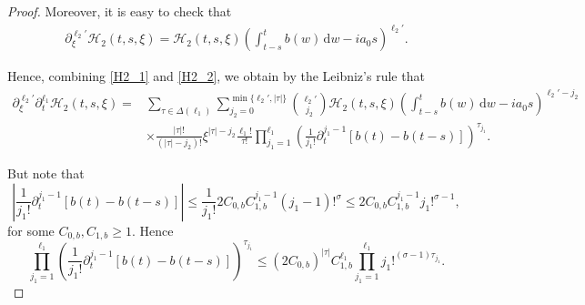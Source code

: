 \documentclass[11pt,reqno]{amsart}
\numberwithin{equation}{section}
\theoremstyle{definition}
\theoremstyle{definition}
\begin{document}
\begin{proof}
    Moreover, it is easy to check that 
    \begin{align}\label{H2_2}
        \partial_\xi^{\ell_2'}\mathcal{H}_2(t,s,\xi) = \mathcal{H}_2(t,s,\xi)\left(\int_{t-s}^tb(w)\,\mathrm{d}w-ia_0s\right)^{\ell_2'}.
    \end{align}
    
    Hence, combining \eqref{H2_1} and \eqref{H2_2}, we obtain by the Leibniz's rule that
    \begin{align*}
    \partial_\xi^{\ell_2'}\partial_t^{\ell_1}\mathcal{H}_2(t,s,\xi) =&\sum_{\tau\in\Delta(\ell_1)}\sum_{j_2=0}^{\min\{\ell_2',|\tau|\}}\binom{\ell_2'}{j_2}\mathcal{H}_2(t,s,\xi)\left(\int_{t-s}^tb(w)\,\mathrm{d}w-ia_0s\right)^{\ell_2'-j_2}\\&\times\frac{|\tau|!}{(|\tau|-j_2)!}\xi^{|\tau|-j_2}
    \frac{\ell_1!}{\tau!}\prod_{j_1=1}^{\ell_1}\left(\frac{1}{j_1!}\partial_t^{j_1-1}[b(t)-b(t-s)]\right)^{\tau_{j_1}}. 
\end{align*}

But note that
\begin{equation*}
    \left|\frac{1}{j_1!}\partial_t^{j_1-1}[b(t)-b(t-s)]\right|\leq \frac{1}{j_1!}2C_{0,b}C_{1,b}^{j_1-1}(j_1-1)!^\sigma\leq 2C_{0,b}C_{1,b}^{j_1-1}j_1!^{\sigma-1}, 
\end{equation*}
for some $C_{0,b},C_{1,b}\geq 1$. Hence
\begin{equation*}
   \prod_{j_1=1}^{\ell_1}\left(\frac{1}{j_1!}\partial_t^{j_1-1}[b(t)-b(t-s)]\right)^{\tau_{j_1}}\leq (2C_{0,b})^{|\tau|}C_{1,b}^{\ell_1}\prod_{j_1=1}^{\ell_1}j_1!^{(\sigma-1)\tau_{j_1}}. 
\end{equation*}


\end{proof}
\end{document}
